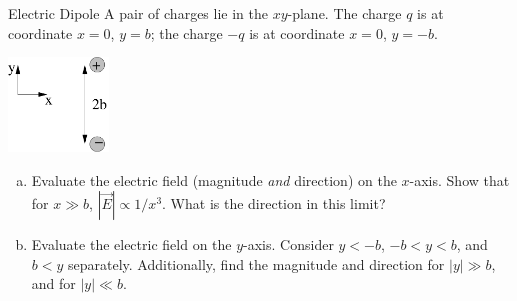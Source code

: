 \documentclass{esg8022pset}
\begin{document}
\begin{problem}{Electric Dipole}
  A pair of charges lie in the $xy$-plane.  The charge $q$ is at coordinate $x = 0$, $y = b$; the charge $-q$ is at coordinate $x = 0$, $y = -b$.
  \begin{center}\includegraphics[width=0.2\textwidth]{ps01_8}\end{center}
  \begin{enumerate}[(a)]
    \item Evaluate the electric field (magnitude \emph{and} direction) on the $x$-axis.  Show that for $x \gg b$, $|\vec E| \propto 1 / x^3$.  What is the direction in this limit?
    \item Evaluate the electric field on the $y$-axis.  Consider $y < -b$, $-b < y < b$, and $b < y$ separately.  Additionally, find the magnitude and direction for $|y| \gg b$, and for $|y| \ll b$.
  \end{enumerate}
\end{problem}
\end{document}
